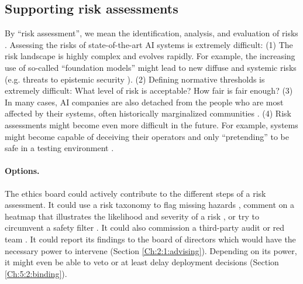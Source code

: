 \documentclass{article}
\begin{document}
\subsection{Supporting risk assessments}\label{Ch:2:3:supporting}

By “risk assessment”, we mean the identification, analysis, and evaluation of risks \cite{iso51_2014, iso31000_2018}. Assessing the risks of state-of-the-art AI systems is extremely difficult: (1) The risk landscape is highly complex and evolves rapidly. For example, the increasing use of so-called “foundation models” \cite{bommasani2022opportunities} might lead to new diffuse and systemic risks (e.g. threats to epistemic security \cite{seger2022defence}). (2) Defining normative thresholds is extremely difficult: What level of risk is acceptable? How fair is fair enough? (3) In many cases, AI companies are also detached from the people who are most affected by their systems, often historically marginalized communities \cite{mohamed2020decolonial, birhane2022power}. (4) Risk assessments might become even more difficult in the future. For example, systems might become capable of deceiving their operators and only “pretending” to be safe in a testing environment \cite{ngo2023alignment}.

\paragraph{Options.} The ethics board could actively contribute to the different steps of a risk assessment. It could use a risk taxonomy to flag missing hazards \cite{weidinger2021ethical}, comment on a heatmap that illustrates the likelihood and severity of a risk \cite{iec31010_2019}, or try to circumvent a safety filter \cite{rando2022redteaming}. It could also commission a third-party audit \cite{raji2019actionable, brundage2020trustworthy, falco2021governing, raji2022outsider, mokander2021ethics, mökander2023auditing} or red team \cite{ganguli2022red, perez2022red, rando2022redteaming}. It could report its findings to the board of directors which would have the necessary power to intervene (Section \ref{Ch:2:1:advising}). Depending on its power, it might even be able to veto or at least delay deployment decisions (Section \ref{Ch:5:2:binding}).
\end{document}
